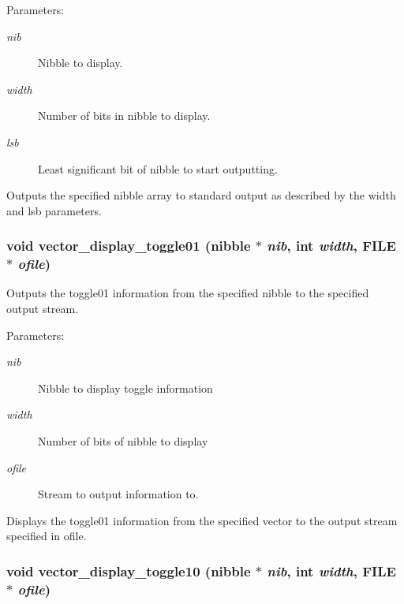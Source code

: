 \begin{Desc}
\item[Parameters: ]\par
\begin{description}
\item[{\em 
nib}]Nibble to display. \item[{\em 
width}]Number of bits in nibble to display. \item[{\em 
lsb}]Least significant bit of nibble to start outputting.\end{description}
\end{Desc}
Outputs the specified nibble array to standard output as described by the width and lsb parameters. 
\subsubsection{\setlength{\rightskip}{0pt plus 5cm}void vector\_\-display\_\-toggle01 ({\bf nibble} $\ast$ {\em nib}, int {\em width}, FILE $\ast$ {\em ofile})}\label{vector_8c_a12}


Outputs the toggle01 information from the specified nibble to the specified output stream.

\begin{Desc}
\item[Parameters: ]\par
\begin{description}
\item[{\em 
nib}]Nibble to display toggle information \item[{\em 
width}]Number of bits of nibble to display \item[{\em 
ofile}]Stream to output information to.\end{description}
\end{Desc}
Displays the toggle01 information from the specified vector to the output stream specified in ofile. 
\subsubsection{\setlength{\rightskip}{0pt plus 5cm}void vector\_\-display\_\-toggle10 ({\bf nibble} $\ast$ {\em nib}, int {\em width}, FILE $\ast$ {\em ofile})}\label{vector_8c_a13}


